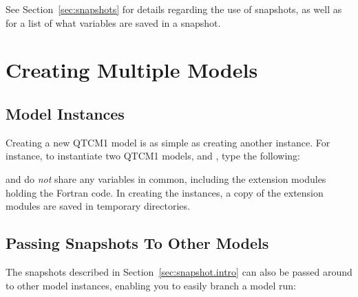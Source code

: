 See Section~\ref{sec:snapshots} for details regarding the use of
snapshots, as well as for a list of what variables are saved in
a snapshot.




\section{Creating Multiple Models}

	\subsection{Model Instances}

Creating a new QTCM1 model is as simple as creating another
 instance.
For instance, to instantiate two QTCM1
models,  and , type the following:

\begin{codeblock}
\end{codeblock}

 and  do \emph{not} share any variables
in common, including the extension modules holding the Fortran
code.  In creating the instances, a copy of the extension modules
are saved in temporary directories.


	\subsection{Passing Snapshots To Other Models}

The snapshots described in Section~\ref{sec:snapshot.intro}
can also be passed around to other model instances,
enabling you to easily branch a model run:

\begin{codeblock}
\end{codeblock}

